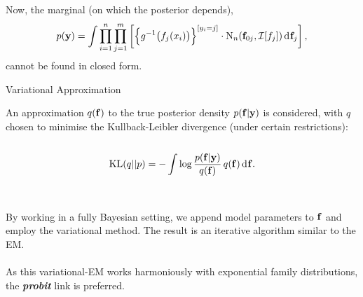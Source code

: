 \documentclass{beamer}
\newlength{\onecolwid}
\newlength{\twocolwid}
\begin{document}
\begin{frame}[t]
\begin{columns}[t]
\begin{column}{\twocolwid}
\begin{columns}[t,totalwidth=\twocolwid]
\begin{column}{\onecolwid}
\vspace{-2cm}
\begin{block}{}

Now, the marginal (on which the posterior depends),
\[
  p({\mathbf y}) = \int \prod_{i=1}^n \prod_{j=1}^m \left[ \Big\{ g^{-1}\big( f_j(x_i) \big) \Big\}^{[y_i = j]} \cdot \operatorname{N}_n({\mathbf f}_{0j},{\mathcal I}[f_j]) \operatorname{d\!\:\!} {\mathbf f}_j \right],
\]
cannot be found in closed form.

\end{block}

\begin{block}{Variational Approximation}

An approximation $q({\mathbf f})$ to the true posterior density $p({\mathbf f}|{\mathbf y})$ is considered, with $q$ chosen to minimise the Kullback-Leibler divergence (under certain restrictions):
\\~\\[-2.5ex]
\[
  \operatorname{KL}(q||p) = -\int \log \frac{p({\mathbf f}|{\mathbf y})}{q({\mathbf f})} \, q({\mathbf f}) \operatorname{d\!\:\!} {\mathbf f}.
\]
\\~\\[-0.3ex]
By working in a fully Bayesian setting, we append model parameters to ${\mathbf f}$ and employ the variational method. The result is an iterative algorithm similar to the EM.
\\~\\[-0.8ex]
As this variational-EM works harmoniously with exponential family distributions, the {\bf\emph{probit}} link is preferred.
  
\end{block}


\end{column}
\end{columns}
\end{column}
\end{columns}
\end{frame}
\end{document}
